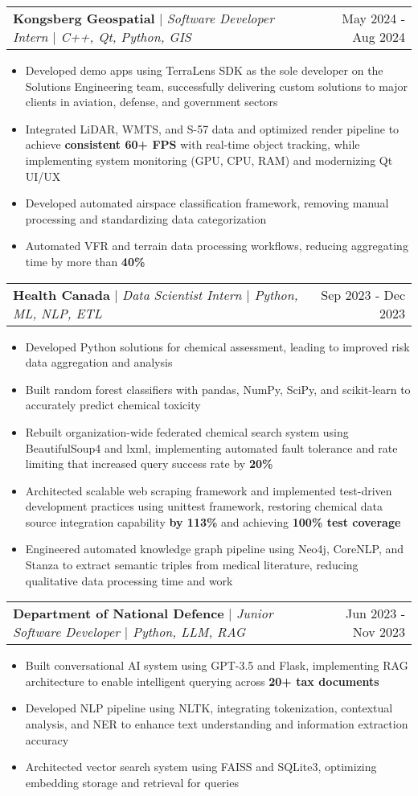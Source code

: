 \documentclass[letterpaper,10pt]{article}
\makeatletter
\newcommand{\resumeItem}[1]{
  \item\small{
    {#1 \vspace{-3.5pt}}
  }
}
\newcommand{\resumeSubheading}[3]{
    \item
    \begin{tabular*}{0.97\textwidth}[t]{l@{\extracolsep{\fill}}r}
      \textbf{#1} $|$ \textit{ #2} & #3 \\
    \end{tabular*}\vspace{-6pt}
}
\newcommand{\resumeItemListStart}{\begin{itemize}}
\newcommand{\resumeItemListEnd}{\end{itemize}\vspace{-5pt}}
\makeatother
\begin{document}
    \resumeSubheading{Kongsberg Geospatial}{Software Developer Intern $|$ C++, Qt, Python, GIS}{May 2024 - Aug 2024}
      \resumeItemListStart
        \resumeItem{Developed demo apps using TerraLens SDK as the sole developer on the Solutions Engineering team, successfully delivering custom solutions to major clients in aviation, defense, and government sectors}
        \resumeItem{Integrated LiDAR, WMTS, and S-57 data and optimized render pipeline to achieve \textbf{consistent 60+ FPS} with real-time object tracking, while implementing system monitoring (GPU, CPU, RAM) and modernizing Qt UI/UX}
        \resumeItem{Developed automated airspace classification framework, removing manual processing and standardizing data categorization}
        \resumeItem{Automated VFR and terrain data processing workflows, reducing aggregating time by more than \textbf{40\%}}
      \resumeItemListEnd

    \resumeSubheading{Health Canada}{Data Scientist Intern $|$ Python, ML, NLP, ETL}{Sep 2023 - Dec 2023}
      \resumeItemListStart
        \resumeItem{Developed Python solutions for chemical assessment, leading to improved risk data aggregation and analysis}
        \resumeItem{Built random forest classifiers with pandas, NumPy, SciPy, and scikit-learn to accurately predict chemical toxicity}
        \resumeItem{Rebuilt organization-wide federated chemical search system using BeautifulSoup4 and lxml, implementing automated fault tolerance and rate limiting that increased query success rate by \textbf{20\%}}
        \resumeItem{Architected scalable web scraping framework and implemented test-driven development practices using unittest framework, restoring chemical data source integration capability \textbf{by 113\%} and achieving \textbf{100\% test coverage}}
        \resumeItem{Engineered automated knowledge graph pipeline using Neo4j, CoreNLP, and Stanza to extract semantic triples from medical literature, reducing qualitative data processing time and work}
      \resumeItemListEnd

    \resumeSubheading{Department of National Defence}{Junior Software Developer $|$ Python, LLM, RAG}{Jun 2023 - Nov 2023}
      \resumeItemListStart
        \resumeItem{Built conversational AI system using GPT-3.5 and Flask, implementing RAG architecture to enable intelligent querying across \textbf{20+ tax documents}}
        \resumeItem{Developed NLP pipeline using NLTK, integrating tokenization, contextual analysis, and NER to enhance text understanding and information extraction accuracy}
        \resumeItem{Architected vector search system using FAISS and SQLite3, optimizing embedding storage and retrieval for queries}
      \resumeItemListEnd
\end{document}
